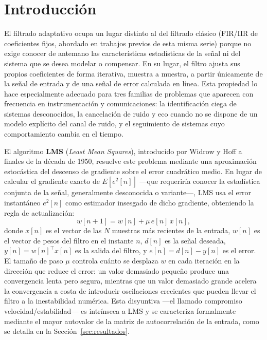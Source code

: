 \section{Introducción}
\label{sec:introduccion}

El filtrado adaptativo ocupa un lugar distinto al del filtrado clásico
(FIR/IIR de coeficientes fijos, abordado en trabajos previos de esta
misma serie) porque no exige conocer de antemano las características
estadísticas de la señal ni del sistema que se desea modelar o
compensar. En su lugar, el filtro ajusta sus propios coeficientes de
forma iterativa, muestra a muestra, a partir únicamente de la señal de
entrada y de una señal de error calculada en línea. Esta propiedad lo
hace especialmente adecuado para tres familias de problemas que
aparecen con frecuencia en instrumentación y comunicaciones: la
identificación ciega de sistemas desconocidos, la cancelación de ruido
y eco cuando no se dispone de un modelo explícito del canal de ruido,
y el seguimiento de sistemas cuyo comportamiento cambia en el tiempo.

El algoritmo \textbf{LMS} (\textit{Least Mean Squares}), introducido
por Widrow y Hoff a finales de la década de 1950, resuelve este
problema mediante una aproximación estocástica del descenso de
gradiente sobre el error cuadrático medio. En lugar de calcular el
gradiente exacto de $E[e^2[n]]$ —que requeriría conocer la estadística
conjunta de la señal, generalmente desconocida o variante—, LMS usa el
error instantáneo $e^2[n]$ como estimador insesgado de dicho gradiente,
obteniendo la regla de actualización:
\begin{equation}
w[n+1] = w[n] + \mu \, e[n] \, x[n],
\label{eq:lms}
\end{equation}
donde $x[n]$ es el vector de las $N$ muestras más recientes de la
entrada, $w[n]$ es el vector de pesos del filtro en el instante $n$,
$d[n]$ es la señal deseada, $y[n] = w[n]^\top x[n]$ es la salida del
filtro, y $e[n] = d[n] - y[n]$ es el error. El tamaño de paso $\mu$
controla cuánto se desplaza $w$ en cada iteración en la dirección que
reduce el error: un valor demasiado pequeño produce una convergencia
lenta pero segura, mientras que un valor demasiado grande acelera la
convergencia a costa de introducir oscilaciones crecientes que pueden
llevar el filtro a la inestabilidad numérica. Esta disyuntiva —el
llamado compromiso velocidad/estabilidad— es intrínseca a LMS y se
caracteriza formalmente mediante el mayor autovalor de la matriz de
autocorrelación de la entrada, como se detalla en la
Sección~\ref{sec:resultados}.

